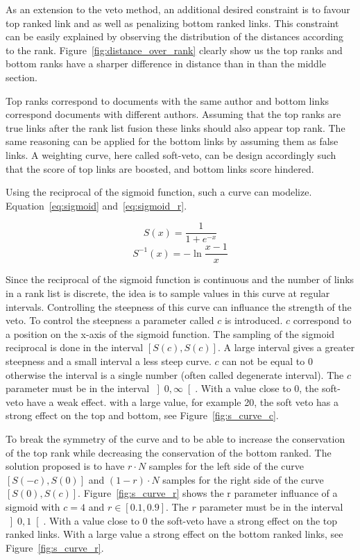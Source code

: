 As an extension to the veto method, an additional desired constraint is to favour top ranked link and as well as penalizing bottom ranked links.
This constraint can be easily explained by observing the distribution of the distances according to the rank.
Figure~\ref{fig:distance_over_rank} clearly show us the top ranks and bottom ranks have a sharper difference in distance than in than the middle section.

Top ranks correspond to documents with the same author and bottom links correspond documents with different authors.
Assuming that the top ranks are true links after the rank list fusion these links should also appear top rank.
The same reasoning can be applied for the bottom links by assuming them as false links.
A weighting curve, here called soft-veto, can be design accordingly such that the score of top links are boosted, and bottom links score hindered.

Using the reciprocal of the sigmoid function, such a curve can modelize.
Equation~\ref{eq:sigmoid} and~\ref{eq:sigmoid_r}.

\begin{equation}
  \label{eq:sigmoid}
  S(x) = \frac{1}{1+e^{-x}}
\end{equation}
\begin{equation}
  \label{eq:sigmoid_r}
  S^{-1}(x) = -\ln{\frac{x-1}{x}}
\end{equation}

Since the reciprocal of the sigmoid function is continuous and the number of links in a rank list is discrete, the idea is to sample values in this curve at regular intervals.
Controlling the steepness of this curve can influance the strength of the veto.
To control the steepness a parameter called $c$ is introduced.
$c$ correspond to a position on the x-axis of the sigmoid function.
The sampling of the sigmoid reciprocal is done in the interval $\left[S(c), S(c)\right]$.
A large interval gives a greater steepness and a small interval a less steep curve.
$c$ can not be equal to 0 otherwise the interval is a single number (often called degenerate interval).
The $c$ parameter must be in the interval $\left]0, \infty\right[$.
With a value close to $0$, the soft-veto have a weak effect.
with a large value, for example 20, the soft veto has a strong effect on the top and bottom, see Figure~\ref{fig:s_curve_c}.

To break the symmetry of the curve and to be able to increase the conservation of the top rank while decreasing the conservation of the bottom ranked.
The solution proposed is to have $r \cdot N$ samples for the left side of the curve $\left[S(-c), S(0)\right]$
and $(1-r) \cdot N$ samples for the right side of the curve $\left[S(0), S(c)\right]$.
Figure~\ref{fig:s_curve_r} shows the r parameter influance of a sigmoid with $c = 4$ and $r \in \left[0.1, 0.9\right]$.
The $r$ parameter must be in the interval $\left]0, 1\right[$.
With a value close to $0$ the soft-veto have a strong effect on the top ranked links.
With a large value a strong effect on the bottom ranked links, see Figure~\ref{fig:s_curve_r}.

